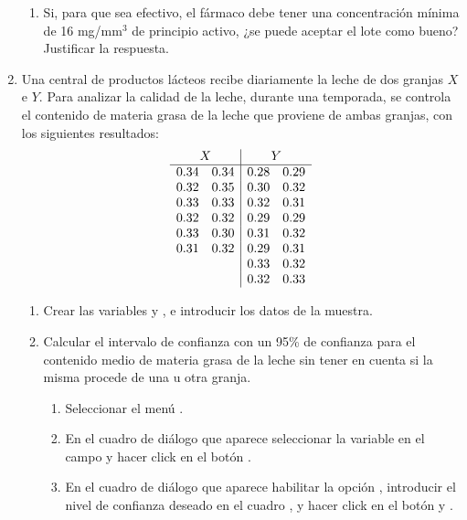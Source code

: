 \begin{enumerate}[leftmargin=*]
\begin{enumerate}
\item Si, para que sea efectivo, el fármaco debe tener una concentración mínima de 16 mg/mm$^3$ de principio activo, ¿se
puede aceptar el lote como bueno? Justificar la respuesta.
\end{enumerate}

\item  Una central de productos lácteos recibe diariamente la leche de dos granjas $X$ e $Y$. Para analizar la calidad de
la leche, durante una temporada, se controla el contenido de materia grasa de la leche que proviene de ambas granjas, con
los siguientes resultados: 
\[
\begin{array}{ll|ll}
\multicolumn{2}{c|}{X} & \multicolumn{2}{c}{Y} \\
\hline
0.34 & 0.34 & 0.28 & 0.29 \\
0.32 & 0.35 & 0.30 & 0.32 \\
0.33 & 0.33 & 0.32 & 0.31 \\
0.32 & 0.32 & 0.29 & 0.29 \\
0.33 & 0.30 & 0.31 & 0.32 \\
0.31 & 0.32 & 0.29 & 0.31 \\
 &  & 0.33 & 0.32 \\
 &  & 0.32 & 0.33 \\
\end{array}
\]

\begin{enumerate}

\item Crear las variables  y , e introducir los datos de la muestra.

\item Calcular el intervalo de confianza con un 95\% de confianza para el contenido medio de materia grasa de la leche
sin tener en cuenta si la misma procede de una u otra granja.
\begin{indicacion}
\begin{enumerate}
\item Seleccionar el menú .
\item En el cuadro de diálogo que aparece seleccionar la variable  en el campo
 y hacer click en el botón .
\item En el cuadro de diálogo que aparece habilitar la opción , introducir el nivel
de confianza deseado en el cuadro , y hacer 
click en el botón  y .
\end{enumerate}
\end{indicacion}


\end{enumerate}
\end{enumerate}
